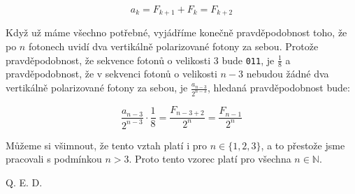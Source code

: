 \documentclass{fkssolpub}
\begin{document}
\[
  a_k = F_{k + 1} + F_k = F_{k + 2}
\]

Když už máme všechno potřebné, vyjádříme konečně pravděpodobnost toho, že po $n$ 
fotonech uvidí dva vertikálně polarizované fotony za sebou. Protože pravděpodobnost, 
že sekvence fotonů o velikosti 3 bude
\verb|011|, je $\frac{1}{8}$ a pravděpodobnost, že v sekvenci fotonů o velikosti
$n - 3$ nebudou žádné dva vertikálně polarizované fotony za sebou, je 
$\frac{a_{n - 3}}{2^{n - 3}}$, hledaná pravděpodobnost bude:

\[
  \frac{a_{n - 3}}{2^{n - 3}} \cdot \frac{1}{8} = \frac{F_{n - 3 + 2}}{2^n} 
    = \frac{F_{n - 1}}{2^n}
\]

Můžeme si všimnout, že tento vztah platí i pro $n \in \{1, 2, 3\}$, a to přestože jsme
pracovali s podmínkou $n > 3$. Proto tento vzorec platí pro všechna $n \in \mathbb{N}$.

Q. E. D.
\end{document}
